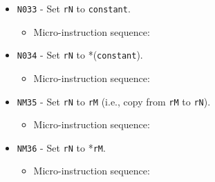 \documentclass{article}
\def\pkptrout{\Verb|0202| - output *\Verb|pk| to data bus}
\def\tmpaptodata{\Verb|2202| - output *\Verb|tmpA| to data bus}
\def\datatotmpa{\Verb|2402| - write to \Verb|tmpA| from data bus}
\def\incrementpk{\Verb|0502| - increment \Verb|pk|}
\def\regtodata#1{\Verb|#1003| - output \Verb|r#1| to data bus}
\def\regptodata#1{\Verb|#1203| - output *\Verb|r#1| to data bus}
\def\datatoreg#1{\Verb|#1403| - write to \Verb|r#1| from data bus}
\def\done{\Verb|fffe| - end instruction}
\begin{document}
\begin{itemize}
    \item \Verb|N033| - Set \Verb|rN| to \Verb|constant|.
    \begin{itemize}
        \item Micro-instruction sequence:
    \end{itemize}

    \item \Verb|N034| - Set \Verb|rN| to *(\Verb|constant|).
    \begin{itemize}
        \item Micro-instruction sequence:
    \end{itemize}

    \item \Verb|NM35| - Set \Verb|rN| to \Verb|rM| (i.e., copy from \Verb|rM| to \Verb|rN|).
    \begin{itemize}
        \item Micro-instruction sequence:
    \end{itemize}

    \item \Verb|NM36| - Set \Verb|rN| to *\Verb|rM|.
    \begin{itemize}
        \item Micro-instruction sequence:
    \end{itemize}
    

\end{itemize}
\end{document}
